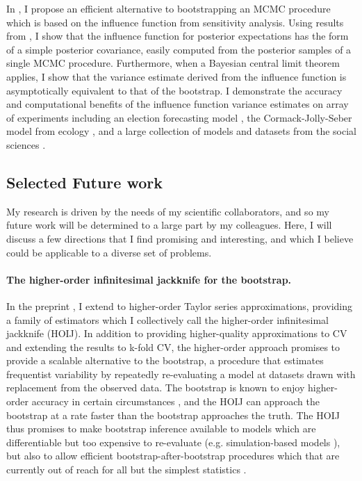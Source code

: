 In \citep{giordano:2020:bayesij, giordano:2020:stanconbayesij}, I propose an
efficient alternative to bootstrapping an MCMC procedure which is based on the
influence function from sensitivity analysis.  Using results from
\citep{giordano:2018:covariances, giordano:2019:ij}, I show that the influence
function for posterior expectations has the form of a simple posterior
covariance, easily computed from the posterior samples of a single MCMC
procedure. Furthermore, when a Bayesian central limit theorem applies, I show
that the variance estimate derived from the influence function is asymptotically
equivalent to that of the bootstrap.  I demonstrate the accuracy and
computational benefits of the influence function variance estimates on array of
experiments including an election forecasting model
\citep{economist:2020:election}, the Cormack-Jolly-Seber model from ecology
\citep{kery:2011:bayesian}, and a large collection of models and datasets from
the social sciences \citep{gelman:2006:arm}.



\subsection*{Selected Future work}

My research is driven by the needs of my scientific collaborators, and
so my future work will be determined to a large part by my colleagues.
Here, I will discuss a few directions that I find promising and interesting,
and which I believe could be applicable to a diverse set of problems.

\paragraph{The higher-order infinitesimal jackknife for the bootstrap.}

In the preprint \citet{giordano2019:hoij}, I extend
\citet{giordano:2019:ij} to higher-order Taylor series approximations,
providing a family of estimators which I collectively call the higher-order
infinitesimal jackknife (HOIJ).  In addition to providing higher-quality
approximations to CV and extending the results to k-fold CV, the higher-order
approach promises to provide a scalable alternative to the bootstrap, a
procedure that estimates frequentist variability by repeatedly re-evaluating a
model at datasets drawn with replacement from the observed data. The bootstrap
is known to enjoy higher-order accuracy in certain circumstances
\citet{hall:2013:bootstrap}, and the HOIJ can approach the bootstrap at a rate
faster than the bootstrap approaches the truth.  The HOIJ thus promises to make
bootstrap inference available to models which are differentiable but too
expensive to re-evaluate (e.g. simulation-based models
\citep{gourieroux:1993:simulation}), but also to allow efficient
bootstrap-after-bootstrap procedures which that are currently out of reach for
all but the simplest statistics \citep{efron:1994:bootstrap}.


